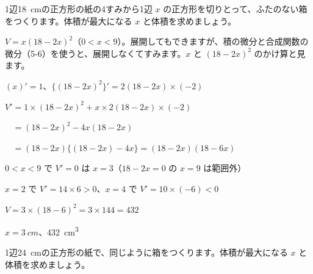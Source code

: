 \begin{reidai}[箱の体積の最大]
1辺\qty{18}{cm}の正方形の紙の4すみから1辺 $x$ の正方形を切りとって、ふたのない箱をつくります。体積が最大になる $x$ と体積を求めましょう。\par
\kangaekata $V=x(18-2x)^2$（$0<x<9$）。展開してもできますが、積の微分と合成関数の微分（5-6）を使うと、展開しなくてすみます。$x$ と $(18-2x)^2$ のかけ算と見ます。\par
\shiki $(x)'=1$、$\{(18-2x)^2\}'=2(18-2x)\times(-2)$\par
\hspace*{2.6\zw}$V'=1\times(18-2x)^2+x\times2(18-2x)\times(-2)$\par
\hspace*{2.6\zw}$\phantom{V'}=(18-2x)^2-4x(18-2x)$\par
\hspace*{2.6\zw}$\phantom{V'}=(18-2x)\{(18-2x)-4x\}=(18-2x)(18-6x)$\par
\hspace*{2.6\zw}$0<x<9$ で $V'=0$ は $x=3$（$18-2x=0$ の $x=9$ は範囲外）\par
\hspace*{2.6\zw}$x=2$ で $V'=14\times6>0$、$x=4$ で $V'=10\times(-6)<0$\par
\hspace*{2.6\zw}$V=3\times(18-6)^2=3\times144=432$\par
\kotae $x=\qty{3}{cm}$、\qty{432}{cm^3}
\end{reidai}

\begin{jibun}
1辺\qty{24}{cm}の正方形の紙で、同じように箱をつくります。体積が最大になる $x$ と体積を求めましょう。
\end{jibun}

